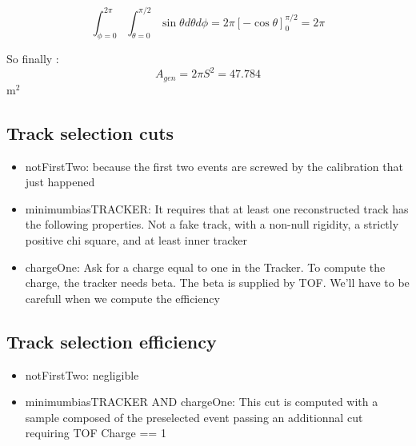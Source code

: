 \documentclass[11pt]{article}
\begin{document}
\[
  \int_{\phi = 0}^{2 \pi}   \int_{\theta = 0}^{\pi/2} \sin \theta d\theta d\phi = 2 \pi \left[ - \cos \theta \right]_{0}^{\pi/2} = 2 \pi
\]

So finally :
\[
A_{gen} = 2 \pi S^2 = 47.784  
\] m$^2$
\subsection{Track selection cuts}
\label{sec-3-3}

\begin{itemize}
\item notFirstTwo: because the first two events are screwed by the calibration that just happened
\item minimumbiasTRACKER:
  It requires that at least one reconstructed track has the following properties.
  Not a fake track, with a non-null rigidity, a strictly positive chi square, and at least inner tracker
\item chargeOne:
  Ask for a charge equal to one in the Tracker. To compute the charge, the tracker needs beta. The beta is supplied by TOF.
  We'll have to be carefull when we compute the efficiency
\end{itemize}
\subsection{Track selection efficiency}
\label{sec-3-4}

\begin{itemize}
\item notFirstTwo: negligible
\item minimumbiasTRACKER AND chargeOne:
  This cut is computed with a sample composed of the preselected event passing an additionnal cut requiring TOF Charge == 1
\end{itemize}
\end{document}
